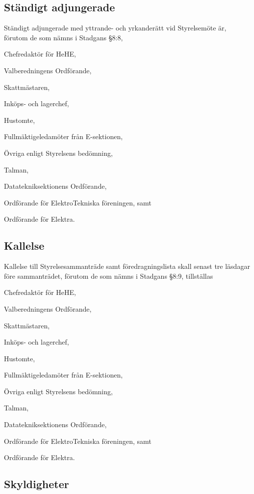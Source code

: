 \documentclass[10pt]{article}
\begin{document}
\subsection{Ständigt adjungerade}
Ständigt adjungerade med yttrande- och yrkanderätt vid Styrelsemöte är,
förutom de som nämns i Stadgans §8:8,
\begin{alphlist}
    \item Chefredaktör för HeHE,
    \item Valberedningens Ordförande,
    \item Skattmästaren,
    \item Inköps- och lagerchef,
    \item Hustomte,
    \item Fullmäktigeledamöter från E-sektionen,
    \item Övriga enligt Styrelsens bedömning,
    \item Talman,
    \item Datatekniksektionens Ordförande,
    \item Ordförande för ElektroTekniska föreningen, samt
    \item Ordförande för Elektra.
\end{alphlist}
\subsection{Kallelse}

Kallelse till Styrelsesammanträde samt föredragningslista skall senast tre
läsdagar före sammanträdet, förutom de som nämns i Stadgans §8:9, tillställas
\begin{alphlist}
    \item Chefredaktör för HeHE,
    \item Valberedningens Ordförande,
    \item Skattmästaren,
    \item Inköps- och lagerchef,
    \item Hustomte,
    \item Fullmäktigeledamöter från E-sektionen,
    \item Övriga enligt Styrelsens bedömning,
    \item Talman,
    \item Datatekniksektionens Ordförande,
    \item Ordförande för ElektroTekniska föreningen, samt
    \item Ordförande för Elektra.
\end{alphlist}
\subsection{Skyldigheter}
\end{document}
